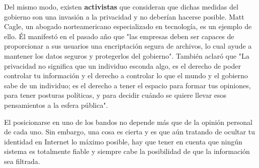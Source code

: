 Del mismo modo, existen \textbf{activistas} que consideran que dichas
medidas del gobierno son una invasión a la privacidad y no deberían
hacerse posible. Matt Cagle, un abogado norteamericano especializado
en tecnología, es un ejemplo de ello. Él manifestó en el pasado año
que "las empresas deben ser capaces de proporcionar a sus usuarios una
encriptación segura de archivos, lo cual ayude a mantener los datos
seguros y protegerlos del gobierno". También aclaró que "La privacidad
no significa que un individuo esconda algo, es el derecho de poder
controlar tu información y el derecho a controlar lo que el mundo y el
gobierno sabe de un individuo; es el derecho a tener el espacio para
formar tus opiniones, para tener posturas políticas, y para decidir
cuándo se quiere llevar esos pensamientos a la esfera pública".

El posicionarse en uno de los bandos no depende más que de la opinión
personal de cada uno. Sin embargo, una cosa es cierta y es que aún
tratando de ocultar tu identidad en Internet lo máximo posible, hay
que tener en cuenta que ningún sistema es totalmente fiable y siempre
cabe la posibilidad de que la información sea filtrada.
